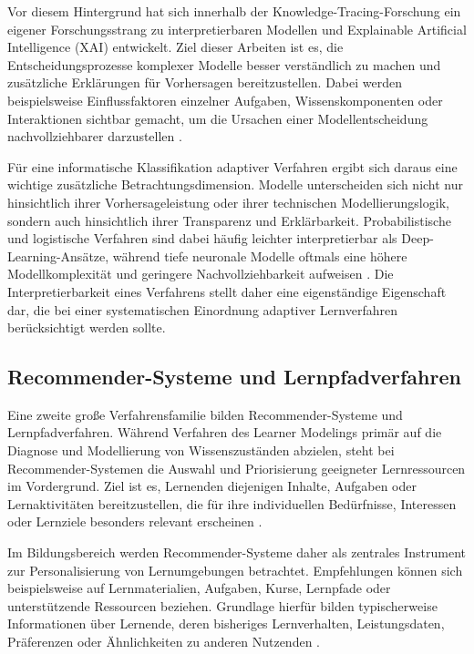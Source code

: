 Vor diesem Hintergrund hat sich innerhalb der
Knowledge-Tracing-Forschung ein eigener Forschungsstrang zu
interpretierbaren Modellen und Explainable Artificial Intelligence (XAI)
entwickelt. Ziel dieser Arbeiten ist es, die Entscheidungsprozesse
komplexer Modelle besser verständlich zu machen und zusätzliche
Erklärungen für Vorhersagen bereitzustellen. Dabei werden beispielsweise
Einflussfaktoren einzelner Aufgaben, Wissenskomponenten oder
Interaktionen sichtbar gemacht, um die Ursachen einer Modellentscheidung
nachvollziehbarer darzustellen \citep{Shen2024}.

Für eine informatische Klassifikation adaptiver Verfahren ergibt sich
daraus eine wichtige zusätzliche Betrachtungsdimension. Modelle
unterscheiden sich nicht nur hinsichtlich ihrer Vorhersageleistung oder
ihrer technischen Modellierungslogik, sondern auch hinsichtlich ihrer
Transparenz und Erklärbarkeit. Probabilistische und logistische
Verfahren sind dabei häufig leichter interpretierbar als
Deep-Learning-Ansätze, während tiefe neuronale Modelle oftmals eine
höhere Modellkomplexität und geringere Nachvollziehbarkeit aufweisen
\citep{Shen2024}. Die Interpretierbarkeit eines Verfahrens stellt daher
eine eigenständige Eigenschaft dar, die bei einer systematischen
Einordnung adaptiver Lernverfahren berücksichtigt werden sollte.

\subsection{Recommender-Systeme und
Lernpfadverfahren}\label{recommender-systeme-und-lernpfadverfahren}

Eine zweite große Verfahrensfamilie bilden Recommender-Systeme und
Lernpfadverfahren. Während Verfahren des Learner Modelings primär auf
die Diagnose und Modellierung von Wissenszuständen abzielen, steht bei
Recommender-Systemen die Auswahl und Priorisierung geeigneter
Lernressourcen im Vordergrund. Ziel ist es, Lernenden diejenigen
Inhalte, Aufgaben oder Lernaktivitäten bereitzustellen, die für ihre
individuellen Bedürfnisse, Interessen oder Lernziele besonders relevant
erscheinen \citep{daSilva2023}.

Im Bildungsbereich werden Recommender-Systeme daher als zentrales
Instrument zur Personalisierung von Lernumgebungen betrachtet.
Empfehlungen können sich beispielsweise auf Lernmaterialien, Aufgaben,
Kurse, Lernpfade oder unterstützende Ressourcen beziehen. Grundlage
hierfür bilden typischerweise Informationen über Lernende, deren
bisheriges Lernverhalten, Leistungsdaten, Präferenzen oder Ähnlichkeiten
zu anderen Nutzenden \citep{daSilva2023}.

